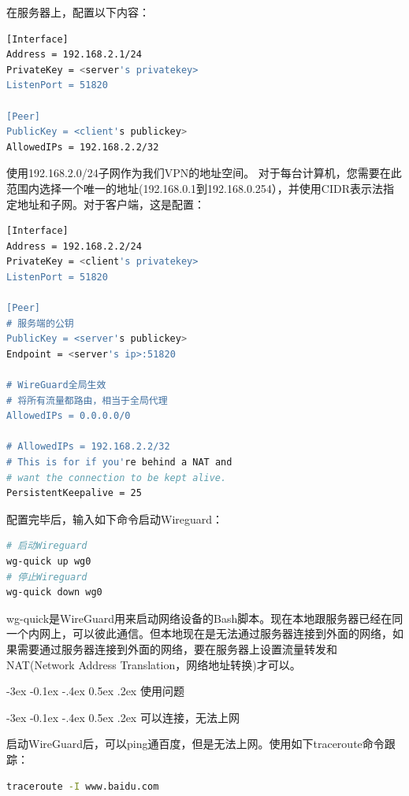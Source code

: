 \documentclass[8pt]{book}
\makeatletter
\numberwithin{dummy}{section}
\theoremstyle{ocrenumbox}
\theoremstyle{blacknumex}
\theoremstyle{blacknumbox}
\theoremstyle{ocrenum}
\renewcommand{\subsection}{\@startsection {subsection}{2}{\z@}
	{-3ex \@plus -0.1ex \@minus -.4ex}
	{0.5ex \@plus.2ex }
	{\normalfont\sffamily\bfseries}}
\makeatother
\begin{document}
在服务器上，配置以下内容：

\begin{lstlisting}[language=Bash]
[Interface]　　
Address = 192.168.2.1/24　　
PrivateKey = <server's privatekey>　　
ListenPort = 51820　　

[Peer]　　
PublicKey = <client's publickey>　　
AllowedIPs = 192.168.2.2/32
\end{lstlisting}

使用192.168.2.0/24子网作为我们VPN的地址空间。 对于每台计算机，您需要在此范围内选择一个唯一的地址(192.168.0.1到192.168.0.254），并使用CIDR表示法指定地址和子网。对于客户端，这是配置：
\begin{lstlisting}[language=Bash]
[Interface]　　
Address = 192.168.2.2/24　　
PrivateKey = <client's privatekey>　　
ListenPort = 51820
　　
[Peer]
# 服务端的公钥　　
PublicKey = <server's publickey>　　
Endpoint = <server's ip>:51820　　

# WireGuard全局生效
# 将所有流量都路由，相当于全局代理
AllowedIPs = 0.0.0.0/0

# AllowedIPs = 192.168.2.2/32　　
# This is for if you're behind a NAT and　　
# want the connection to be kept alive.　　
PersistentKeepalive = 25
\end{lstlisting}

配置完毕后，输入如下命令启动Wireguard：

\begin{lstlisting}[language=Bash]
# 启动Wireguard
wg-quick up wg0
# 停止Wireguard
wg-quick down wg0
\end{lstlisting}

wg-quick是WireGuard用来启动网络设备的Bash脚本。现在本地跟服务器已经在同一个内网上，可以彼此通信。但本地现在是无法通过服务器连接到外面的网络，如果需要通过服务器连接到外面的网络，要在服务器上设置流量转发和NAT(Network Address Translation，网络地址转换)才可以。

\subsection{使用问题}

\subsection{可以连接，无法上网}

启动WireGuard后，可以ping通百度，但是无法上网。使用如下traceroute命令跟踪：

\begin{lstlisting}[language=Bash]
traceroute -I www.baidu.com
\end{lstlisting}
\end{document}

